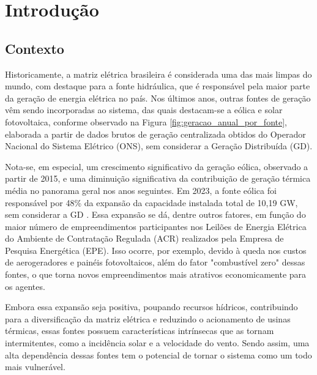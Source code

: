 \chapter{Introdução}
\sloppy																													%

\section{Contexto}
Historicamente, a matriz elétrica brasileira é considerada uma das mais limpas do mundo, com destaque para a fonte
hidráulica, que é responsável pela maior parte da geração de energia elétrica no país. Nos últimos anos, outras fontes
de geração vêm sendo incorporadas ao sistema, das quais destacam-se a eólica e solar fotovoltaica, conforme observado na
Figura \ref{fig:geracao_anual_por_fonte}, elaborada a partir de dados brutos de geração centralizada obtidos do Operador
Nacional do Sistema Elétrico (ONS), sem considerar a Geração Distribuída (GD).

\begin{figure}[!ht]
	{}
	{}
\end{figure}

Nota-se, em especial, um crescimento significativo da geração eólica, observado a partir de 2015, e uma diminuição 
significativa da contribuição de geração térmica média no panorama geral nos anos seguintes. Em 2023, a fonte eólica 
foi responsável por 48\% da expansão da capacidade instalada total de 10,19 GW, sem considerar a GD \cite{EPE2024}. Essa expansão
se dá, dentre outros fatores, em função do maior número de empreendimentos participantes nos Leilões de Energia Elétrica do 
Ambiente de Contratação Regulada (ACR) realizados pela Empresa de Pesquisa Energética (EPE). Isso ocorre, por exemplo,
devido à queda nos custos de aerogeradores e painéis fotovoltaicos, além do fator "combustível zero" dessas fontes, o que torna novos 
empreendimentos mais atrativos economicamente para os agentes.

Embora essa expansão seja positiva, poupando recursos hídricos, contribuindo para a diversificação da matriz elétrica e
reduzindo o acionamento de usinas térmicas, essas fontes possuem características intrínsecas que as tornam intermitentes,
como a incidência solar e a velocidade do vento. Sendo assim, uma alta dependência dessas fontes tem o potencial
de tornar o sistema como um todo mais vulnerável.

